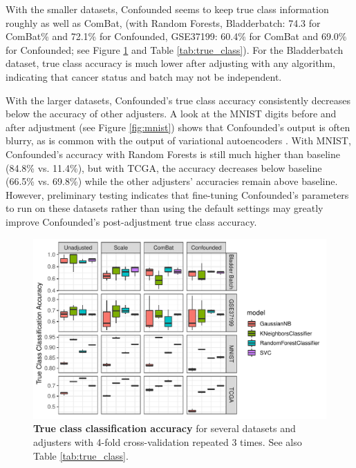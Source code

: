 \documentclass[notitlepage]{article}
\begin{document}
With the smaller datasets, Confounded seems to keep true class information roughly as well as ComBat, (with Random Forests, Bladderbatch: 74.3 for ComBat\% and 72.1\% for Confounded, GSE37199: 60.4\% for ComBat and 69.0\% for Confounded; see Figure \ref{fig:true_class} and Table \ref{tab:true_class}).
For the Bladderbatch dataset, true class accuracy is much lower after adjusting with any algorithm, indicating that cancer status and batch may not be independent.

With the larger datasets, Confounded's true class accuracy consistently decreases below the accuracy of other adjusters.
A look at the MNIST digits before and after adjustment (see Figure \ref{fig:mnist}) shows that Confounded's output is often blurry, as is common with the output of variational autoencoders \cite{hou_deep_2016}.
With MNIST, Confounded's accuracy with Random Forests is still much higher than baseline (84.8\% vs. 11.4\%), but with TCGA, the accuracy decreases below baseline (66.5\% vs. 69.8\%) while the other adjusters' accuracies remain above baseline.
However, preliminary testing indicates that fine-tuning Confounded's parameters to run on these datasets rather than using the default settings may greatly improve Confounded's post-adjustment true class accuracy.

\begin{figure}
	\centering
	\includegraphics[width=\columnwidth]{figures/final/true_class_accuracy.pdf}
	\caption{\textbf{True class classification accuracy} for several datasets and adjusters with 4-fold cross-validation repeated 3 times.
	See also Table \ref{tab:true_class}.}
	\label{fig:true_class}
\end{figure}
\begin{table}
	\centering
	
	\caption{\textbf{True class classification accuracy} for several datasets and adjusters.
	After adjustment by the ideal batch adjuster, all true class signal should be preserved, and all classifiers should therefore have the same accuracy in predicting true class before and after adjustment.
	See also Figure \ref{fig:true_class}.}
	\label{tab:true_class}
\end{table}
\end{document}

